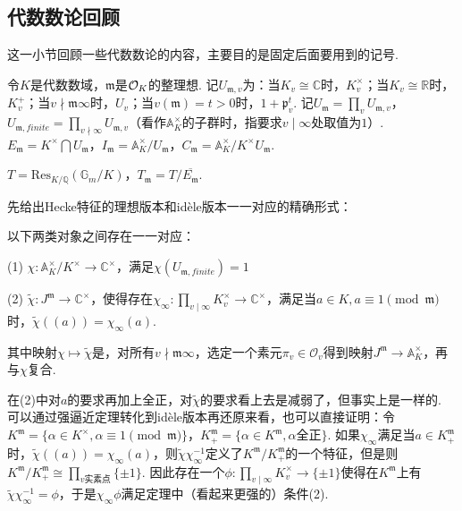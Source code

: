 \subsection{代数数论回顾}

这一小节回顾一些代数数论的内容，主要目的是固定后面要用到的记号.

令$K$是代数数域，$\mathfrak{m}$是$\mathcal{O}_K$的整理想. 记$U_{\mathfrak{m}, v}$为：当$K_v \cong \mathbb{C}$时，$K_v^{\times}$；当$K_v\cong \mathbb{R}$时，$K_v^{+}$；当$v\nmid\mathfrak{m}\infty$时，$U_{v}$；当$v(\mathfrak{m})=t>0$时，$1+\mathfrak{p}_v^{t}$. 记$U_{\mathfrak{m}}=\prod_v U_{\mathfrak{m}, v}$，$U_{\mathfrak{m}, finite} = \prod_{v\nmid \infty}U_{\mathfrak{m}, v}$（看作$\mathbb{A}_K^{\times}$的子群时，指要求$v\mid \infty$处取值为$1$）. $E_{\mathfrak{m}} = K^{\times} \bigcap U_{\mathfrak{m}}$，$I_{\mathfrak{m}} = \mathbb{A}_K^{\times}/U_{\mathfrak{m}}$，$C_{\mathfrak{m}} = \mathbb{A}_K^{\times} / K^{\times}U_{\mathfrak{m}}$.

$T = \mathrm{Res}_{K/\mathbb{Q}}(\mathbb{G}_m/K)$，$T_{\mathfrak{m}} = T / \overline{E_{\mathfrak{m}}}$.

先给出Hecke特征的理想版本和idèle版本一一对应的精确形式：

\begin{cthm}
    以下两类对象之间存在一一对应：

    (1) $\chi: \mathbb{A}_K^{\times}/K^{\times} \to \mathbb{C}^{\times}$，满足$\chi(U_{\mathfrak{m}, finite}) = 1$

    (2) $\tilde{\chi}: J^{\mathfrak{m}}\to \mathbb{C}^{\times}$，使得存在$\chi_{\infty}:\prod_{v\mid \infty}K_v^{\times} \to \mathbb{C}^{\times}$，满足当$a\in K, a\equiv 1\pmod{\mathfrak{m}}$时，$\tilde{\chi}((a)) = \chi_{\infty}(a)$.

    其中映射$\chi\mapsto \tilde{\chi}$是，对所有$v\nmid \mathfrak{m}\infty$，选定一个素元$\pi_v\in \mathcal{O}_v$得到映射$J^{\mathfrak{m}}\to \mathbb{A}_K^{\times}$，再与$\chi$复合.
\end{cthm}

\begin{crem}
    在(2)中对$a$的要求再加上全正，对$\tilde{\chi}$的要求看上去是减弱了，但事实上是一样的. 可以通过强逼近定理转化到idèle版本再还原来看，也可以直接证明：令$K^{\mathfrak{m}} = \{\alpha\in K^{\times}, \alpha\equiv 1\pmod{\mathfrak{m}}\}$，$K^{\mathfrak{m}}_{+} = \{\alpha\in K^{\mathfrak{m}}, \alpha 全正\}$. 如果$\chi_{\infty}$满足当$a\in K^{\mathfrak{m}}_{+}$时，$\tilde{\chi}((a)) = \chi_{\infty}(a)$，则$\tilde{\chi}\chi_{\infty}^{-1}$定义了$K^{\mathfrak{m}}/K^{\mathfrak{m}}_{+}$的一个特征，但是则$K^{\mathfrak{m}}/K^{\mathfrak{m}}_{+} \cong \prod_{v实素点} \{\pm 1\}$. 因此存在一个$\phi: \prod_{v\mid \infty} K_v^{\times}\to \{\pm 1\}$使得在$K^{\mathfrak{m}}$上有$\tilde{\chi}\chi_{\infty}^{-1} = \phi$，于是$\chi_{\infty}\phi$满足定理中（看起来更强的）条件(2).
\end{crem}

